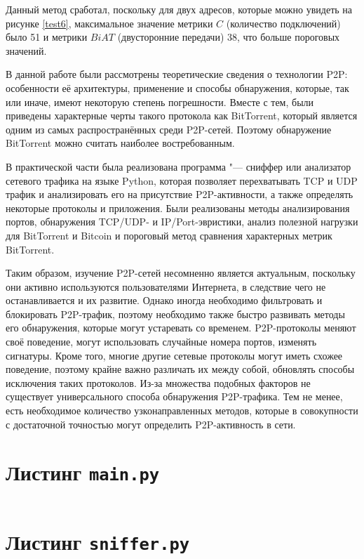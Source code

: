 \documentclass[bachelor, och, coursework]{SCWorks}
\begin{document}
Данный метод сработал, поскольку для двух адресов, которые можно увидеть на рисунке \ref{test6}, максимальное значение метрики $C$ (количество подключений) было 51 и метрики $BiAT$ (двусторонние передачи) 38, что больше пороговых значений.

\conclusion
В данной работе были рассмотрены теоретические сведения о технологии P2P: особенности её архитектуры, применение
и способы обнаружения, которые, так или иначе, имеют некоторую степень погрешности. Вместе с тем, были приведены характерные черты такого протокола как BitTorrent, который является одним из самых распространённых среди P2P-сетей.
Поэтому обнаружение BitTorrent можно считать наиболее востребованным.

В практической части была реализована программа "--- сниффер или анализатор сетевого трафика на языке Python, которая позволяет
перехватывать TCP и UDP трафик и анализировать его на присутствие P2P-активности, а также определять некоторые протоколы и приложения. Были реализованы методы анализирования портов, обнаружения TCP/UDP- и IP/Port-эвристики, анализ полезной нагрузки для BitTorrent и Bitcoin и пороговый метод сравнения характерных метрик BitTorrent.

Таким образом, изучение P2P-сетей несомненно является актуальным, поскольку они активно используются пользователями Интернета, в следствие чего не останавливается и их развитие. Однако иногда необходимо фильтровать и блокировать P2P-трафик, поэтому необходимо также быстро развивать методы его обнаружения, которые могут устаревать со временем. P2P-протоколы меняют своё поведение, могут использовать случайные номера портов, изменять сигнатуры. Кроме того, многие другие сетевые протоколы могут иметь схожее поведение, поэтому крайне важно различать их между собой, обновлять способы исключения таких протоколов. Из-за множества подобных факторов не существует универсального способа обнаружения P2P-трафика. Тем не менее, есть необходимое количество узконаправленных методов, которые в совокупности с достаточной 
точностью могут определить P2P-активность в сети.




\appendix

    \section{Листинг \texttt{main.py}}
    \inputminted{py}{code/sniffer/main.py}

    \section{Листинг \texttt{sniffer.py}}
    \inputminted{py}{code/sniffer/sniffer.py}
\end{document}
